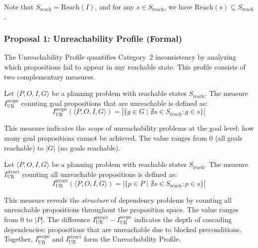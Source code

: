 Note that $S_{\text{reach}} = \text{Reach}(I)$, and for any $s \in S_{\text{reach}}$,
we have $\text{Reach}(s) \subseteq S_{\text{reach}}$.

\subsubsection{Proposal 1: Unreachability Profile (Formal)}

The Unreachability Profile quantifies Category~2 inconsistency by analyzing which propositions fail to appear in any reachable state. This profile consists of two complementary measures.

\begin{defn}
    Let $\langle P, O, I, G \rangle$ be a planning problem with reachable states $S_{\text{reach}}$. The measure $I^{\text{scope}}_{\text{UR}}$ counting goal propositions that are unreachable is defined as:
    \begin{equation*}
        I^{\text{scope}}_{\text{UR}}(\langle P, O, I, G \rangle) = |\{g \in G \mid \nexists s \in S_{\text{reach}} : g \in s\}|
    \end{equation*}
\end{defn}

This measure indicates the \emph{scope} of unreachability problems at the goal level: how many goal propositions cannot be achieved. The value ranges from $0$ (all goals reachable) to $|G|$ (no goals reachable).

\begin{defn}
    Let $\langle P, O, I, G \rangle$ be a planning problem with reachable states $S_{\text{reach}}$. The measure $I^{\text{struct}}_{\text{UR}}$ counting all unreachable propositions is defined as:
    \begin{equation*}
        I^{\text{struct}}_{\text{UR}}(\langle P, O, I, G \rangle) = |\{p \in P \mid \nexists s \in S_{\text{reach}} : p \in s\}|
    \end{equation*}
\end{defn}

This measure reveals the \emph{structure} of dependency problems by counting all unreachable propositions throughout the proposition space. The value ranges from $0$ to $|P|$. The difference $I^{\text{struct}}_{\text{UR}} - I^{\text{scope}}_{\text{UR}}$ indicates the depth of cascading dependencies: propositions that are unreachable due to blocked preconditions. Together, $I^{\text{scope}}_{\text{UR}}$ and $I^{\text{struct}}_{\text{UR}}$ form the Unreachability Profile.


